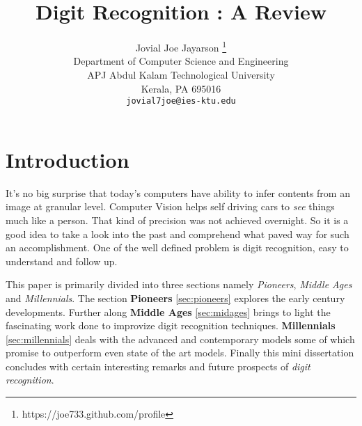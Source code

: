 \documentclass[twocolumn, switch]{article}
\title{Digit Recognition : A Review}
\author{Jovial Joe Jayarson
    \thanks{https://joe733.github.com/profile} \\
    Department of Computer Science and Engineering\\
    APJ Abdul Kalam Technological University\\
    Kerala, PA 695016 \\
    \texttt{jovial7joe@ies-ktu.edu}
}
\begin{document}

\section{Introduction}
    \-\hspace{1cm} It's no big surprise that today's computers have ability to infer contents from an image at granular level. Computer Vision helps self driving cars to \textit{see} things much like a person. That kind of precision was not achieved overnight. So it is a good idea to take a look into the past and comprehend what paved way for such an accomplishment. One of the well defined problem is digit recognition, easy to understand and follow up.
    
    \-\hspace{1cm} This paper is primarily divided into three sections namely \textit{Pioneers}, \textit{Middle Ages} and \textit{Millennials}. The section \textbf{Pioneers} \ref{sec:pioneers} explores the early century developments. Further along \textbf{Middle Ages} \ref{sec:midages} brings to light the fascinating work done to improvize digit recognition techniques. \textbf{Millennials} \ref{sec:millennials} deals with the advanced and contemporary models some of which promise to outperform even state of the art models. Finally this mini dissertation concludes with certain interesting remarks and future prospects of \textit{digit recognition}.
\end{document}
